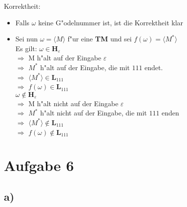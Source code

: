 \documentclass[a4paper,11pt]{scrartcl}
\begin{document}
\noindent Korrektheit:
\begin{itemize}
	\item Falls $\omega$ keine G"odelnummer ist, ist die Korrektheit klar
	\item Sei nun $\omega=\langle M \rangle$ f"ur eine \textbf{TM} und sei $f(\omega)=\langle M^{*} \rangle$\\
	Es gilt: $\omega \in \textbf{H}_{\varepsilon}$\\
	$\Longrightarrow$ M h"alt auf der Eingabe $\varepsilon$\\
	$\Longrightarrow$ $M^*$ h"alt auf der Eingabe, die mit $111$ endet.\\
	$\Longrightarrow$ $\langle M^* \rangle \in \textbf{L}_{111}$\\
	$\Longrightarrow$ $f(\omega) \in \textbf{L}_{111}$\\
	
	
	$\omega \notin \textbf{H}_{\varepsilon}$ \\
	$\Longrightarrow$ M h"alt nicht auf der Eingabe $\varepsilon$\\    
	$\Longrightarrow$ $M^*$ h"alt nicht auf der Eingabe, die mit $111$ enden\\
	$\Longrightarrow$ $\langle M^* \rangle \notin \textbf{L}_{111}$\\
	$\Longrightarrow$ $f(\omega) \notin \textbf{L}_{111}$\\
	
\end{itemize}


\section*{Aufgabe 6}

\subsection*{a)}
\end{document}
